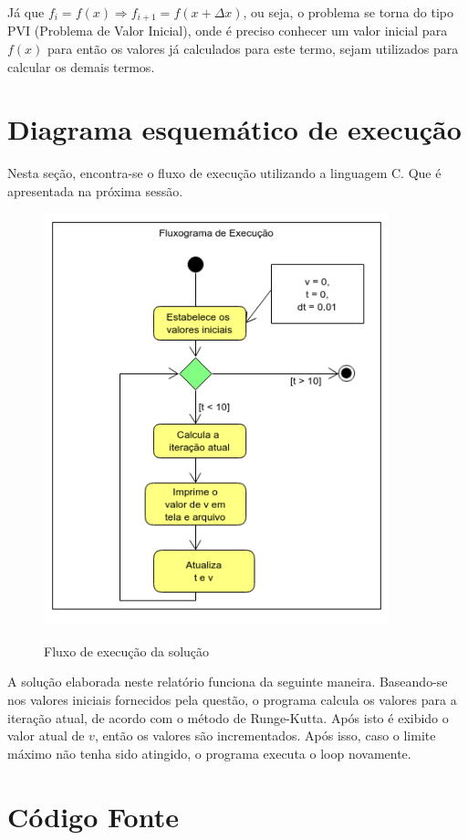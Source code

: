 \documentclass[12pt, hidelinks]{article}
\begin{document}
Já que $f_i = f(x) \Rightarrow f_{i+1} = f(x + \Delta x)$, ou seja, o problema se torna do tipo PVI (Problema de Valor Inicial), onde é preciso conhecer um valor inicial para $f(x)$ para então os valores já calculados para este termo, sejam utilizados para calcular os demais termos.

\section{Diagrama esquemático de execução}
Nesta seção, encontra-se o fluxo de execução utilizando a linguagem C. Que é apresentada na próxima sessão.
\begin{figure}[!h]
  \centering
  \includegraphics[width=10cm]{figuras/fluxograma.png}\\
  \caption{Fluxo de execução da solução}\label{fig:fluxo}
\end{figure}

A solução elaborada neste relatório funciona da seguinte maneira. Baseando-se nos valores iniciais fornecidos pela questão, o programa calcula os valores para a iteração atual, de acordo com o método de Runge-Kutta. Após isto é exibido o valor atual de $v$, então os valores são incrementados. Após isso, caso o limite máximo não tenha sido atingido, o programa executa o loop novamente.

\newpage
\section{Código Fonte}\label{sec:codigofonte}
\end{document}
